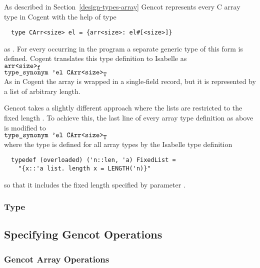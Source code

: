 As described in Section~\ref{design-types-array} Gencot represents every C array type  in 
Cogent with the help of type
\begin{verbatim}
  type CArr<size> el = {arr<size>: el#[<size>]}
\end{verbatim}
as . For every  occurring in the program a separate generic type of this form 
is defined. Cogent translates this type definition to Isabelle as\\[1ex]
\hspace*{2ex} $\textnormal{\texttt{arr<size>}}_{\textnormal{\texttt{\small{f}}}}$ \\
\hspace*{2ex}$\textnormal{\texttt{type\_synonym 'el CArr<size>}}_{\textnormal{\texttt{\small{T}}}}$ \\[1ex]
As in Cogent the array is wrapped in a single-field record, but it is represented by a list of arbitrary length.

Gencot takes a slightly different approach where the lists are restricted to the fixed length .
To achieve this, the last line of every array type definition as above is modified to\\[1ex]
\hspace*{2ex} $\textnormal{\texttt{type\_synonym 'el CArr<size>}}_{\textnormal{\texttt{\small{T}}}}$ \\[1ex]
where the type  is defined for all array types by the Isabelle type definition
\begin{verbatim}
  typedef (overloaded) ('n::len, 'a) FixedList =  
    "{x::'a list. length x = LENGTH('n)}"
\end{verbatim}
so that it includes the fixed length specified by parameter .

\subsubsection{Type }

\subsection{Specifying Gencot Operations}
\label{design-isabelle-operations}

\subsubsection{Gencot Array Operations}

